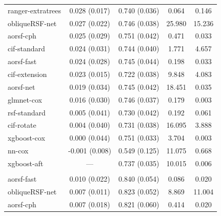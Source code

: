 \documentclass{article}\usepackage[]{graphicx}\usepackage[]{xcolor}
\newenvironment{knitrout}{}{} %
\begin{document}
\begin{knitrout}
\begin{longtable}[t]{lcccc}
\hspace{1em}ranger-extratrees & 0.028 (0.017) & 0.740 (0.036) & 0.064 & 0.146\\
\hspace{1em}obliqueRSF-net & 0.027 (0.022) & 0.746 (0.038) & 25.980 & 15.236\\
\hspace{1em}aorsf-cph & 0.025 (0.029) & 0.751 (0.042) & 0.471 & 0.033\\
\hspace{1em}cif-standard & 0.024 (0.031) & 0.744 (0.040) & 1.771 & 4.657\\
\hspace{1em}aorsf-fast & 0.024 (0.028) & 0.745 (0.044) & 0.198 & 0.033\\
\hspace{1em}cif-extension & 0.023 (0.015) & 0.722 (0.038) & 9.848 & 4.083\\
\hspace{1em}aorsf-net & 0.019 (0.034) & 0.745 (0.042) & 18.451 & 0.035\\
\hspace{1em}glmnet-cox & 0.016 (0.030) & 0.746 (0.037) & 0.179 & 0.003\\
\hspace{1em}rsf-standard & 0.005 (0.041) & 0.730 (0.042) & 0.192 & 0.061\\
\hspace{1em}cif-rotate & 0.004 (0.040) & 0.731 (0.038) & 16.095 & 3.888\\
\hspace{1em}xgboost-cox & 0.000 (0.044) & 0.751 (0.033) & 3.704 & 0.003\\
\hspace{1em}nn-cox & -0.001 (0.008) & 0.549 (0.125) & 11.075 & 0.668\\
\hspace{1em}xgboost-aft & --- & 0.737 (0.035) & 10.015 & 0.006\\
\addlinespace[0.3em]
\multicolumn{5}{l}{\textit{\textbf{ACTG 320; death, n = 1151, p = 12}}}\\
\hline
\hspace{1em}aorsf-fast & 0.010 (0.022) & 0.840 (0.054) & 0.086 & 0.020\\
\hspace{1em}obliqueRSF-net & 0.007 (0.011) & 0.823 (0.052) & 8.869 & 11.004\\
\hspace{1em}aorsf-cph & 0.007 (0.018) & 0.821 (0.060) & 0.414 & 0.020\\

\end{longtable}
\end{knitrout}
\end{document}
